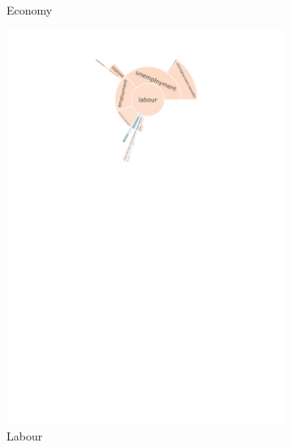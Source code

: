 \begin{figure}[!htbp]
\begin{subfigure}{0.45\textwidth}
		\caption{Economy}
            \label{fig:baly_iptc_weighted_prop_total_leaning_diff_zoom_economy}
	\end{subfigure}
	\begin{subfigure}{0.45\textwidth}
		\includegraphics[trim={0 0 0 0},clip,width=\linewidth]{figures/baly_iptc_weighted_prop_total_leaning_diff_zoom_labour.pdf}
		\caption{Labour}
            \label{fig:baly_iptc_weighted_prop_total_leaning_diff_zoom_labour}
	\end{subfigure}
	\begin{subfigure}{0.45\textwidth}

\end{subfigure}
\end{figure}
